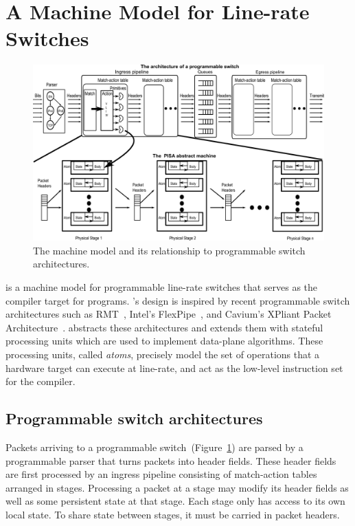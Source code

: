 \section{A Machine Model for Line-rate Switches}
\label{s:absmachine}

\begin{figure}[!t]
  \includegraphics[width=\textwidth]{pisa.pdf}
  \caption{The \absmachine machine model and its relationship to
  programmable switch architectures.}
  \label{fig:switch}
\end{figure}

\absmachine is a machine model for programmable line-rate switches that serves
as the compiler target for \pktlanguage programs.  \absmachine's design is
inspired by recent programmable switch architectures such as RMT~\cite{rmt},
Intel's FlexPipe~\cite{flexpipe}, and Cavium's XPliant Packet
Architecture~\cite{xpliant}. \absmachine abstracts these architectures and
extends them with stateful processing units which are used to implement
data-plane algorithms. These processing units, called {\em atoms}, precisely
model the set of operations that a hardware target can execute at line-rate,
and act as the low-level instruction set for the \pktlanguage compiler.

\subsection{Programmable switch architectures}
Packets arriving to a programmable switch~(Figure~\ref{fig:switch})
are parsed by a programmable parser that turns packets into header
fields. These header fields are first processed by an ingress pipeline
consisting of match-action tables arranged in stages. Processing a
packet at a stage may modify its header fields as well as some
persistent state at that stage. Each stage only has access to its
own local state. To share state between stages, it must be carried in
packet headers.

